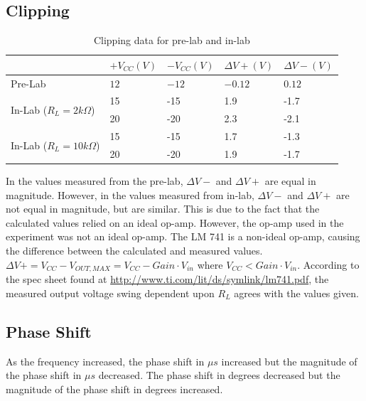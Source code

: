 \documentclass[10pt]{article}
\begin{document}
\subsection*{Clipping}
\begin{table}[H]
	\centering
	\begin{tabular}{lllll}
		\hline
		& $+V_{CC}(V)$ & $-V_{CC}(V)$ & $\Delta V+(V)$ & $\Delta V-(V)$\\
		\hline
		Pre-Lab & $12$ & $-12$ & $-0.12$ & $0.12$\\
		\hline
		\multirow{2}{*}{In-Lab ($R_L=2k\Omega$)} & 15 & -15 & 1.9 & -1.7\\
		& 20 & -20 & 2.3 & -2.1\\
		\hline
		\multirow{2}{*}{In-Lab ($R_L=10k\Omega$)} & 15 & -15 & 1.7 & -1.3\\
		& 20 & -20 & 1.9 & -1.7\\
		\hline
	\end{tabular}
	\caption*{Clipping data for pre-lab and in-lab}
\end{table}
\noindent In the values measured from the pre-lab, $\Delta V-$ and $\Delta V+$ are equal in magnitude. However, in the values measured from in-lab, $\Delta V-$ and $\Delta V+$ are not equal in magnitude, but are similar. This is due to the fact that the calculated values relied on an ideal op-amp. However, the op-amp used in the experiment was not an ideal op-amp. The LM 741 is a non-ideal op-amp, causing the difference between the calculated and measured values. $\Delta V+ = V_{CC} - V_{OUT,MAX} = V_{CC} - Gain\cdot V_{in}$ where $V_{CC} < Gain\cdot V_{in}$. According to the spec sheet found at \url{http://www.ti.com/lit/ds/symlink/lm741.pdf}, the measured output voltage swing dependent upon $R_L$ agrees with the values given.

\subsection*{Phase Shift}
\noindent As the frequency increased, the phase shift in $\mu s$ increased but the magnitude of the phase shift in $\mu s$ decreased. The phase shift in degrees decreased but the magnitude of the phase shift in degrees increased. 
\end{document}
